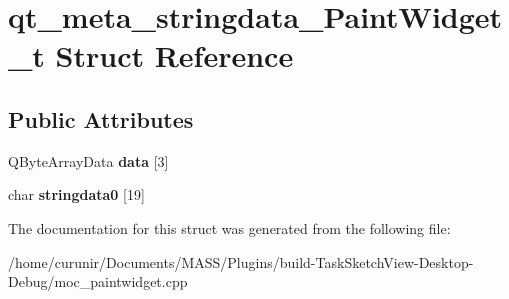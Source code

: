 \hypertarget{structqt__meta__stringdata___paint_widget__t}{}\section{qt\+\_\+meta\+\_\+stringdata\+\_\+\+Paint\+Widget\+\_\+t Struct Reference}
\label{structqt__meta__stringdata___paint_widget__t}
\subsection*{Public Attributes}
\begin{DoxyCompactItemize}
\item 
Q\+Byte\+Array\+Data {\bfseries data} \mbox{[}3\mbox{]}\hypertarget{structqt__meta__stringdata___paint_widget__t_a5a3b5bd01fe537a5c9c754bef68dcd9c}{}\label{structqt__meta__stringdata___paint_widget__t_a5a3b5bd01fe537a5c9c754bef68dcd9c}

\item 
char {\bfseries stringdata0} \mbox{[}19\mbox{]}\hypertarget{structqt__meta__stringdata___paint_widget__t_abc8551923f6d3069b3125bfc2ffcfe82}{}\label{structqt__meta__stringdata___paint_widget__t_abc8551923f6d3069b3125bfc2ffcfe82}

\end{DoxyCompactItemize}


The documentation for this struct was generated from the following file\+:\begin{DoxyCompactItemize}
\item 
/home/curunir/\+Documents/\+M\+A\+S\+S/\+Plugins/build-\/\+Task\+Sketch\+View-\/\+Desktop-\/\+Debug/moc\+\_\+paintwidget.\+cpp\end{DoxyCompactItemize}
